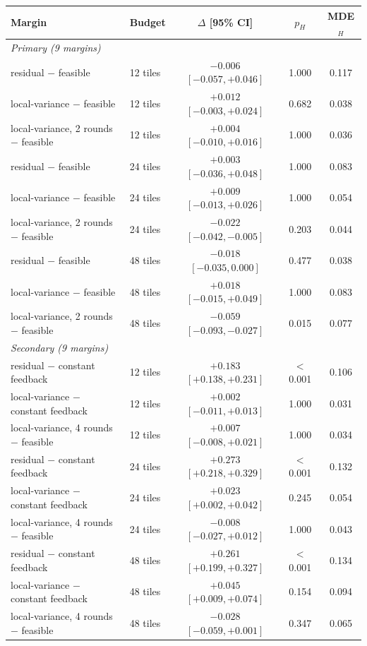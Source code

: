 \begin{tabular}{llccc}
\toprule
Margin & Budget & $\Delta$ [95\% CI] & $p_H$ & MDE$_H$ \\
\midrule
\multicolumn{5}{l}{\emph{Primary (9 margins)}} \\
residual $-$ feasible & 12 tiles & $-0.006$ $[-0.057, {+}0.046]$ & 1.000 & 0.117 \\
local-variance $-$ feasible & 12 tiles & ${+}0.012$ $[-0.003, {+}0.024]$ & 0.682 & 0.038 \\
local-variance, 2 rounds $-$ feasible & 12 tiles & ${+}0.004$ $[-0.010, {+}0.016]$ & 1.000 & 0.036 \\
residual $-$ feasible & 24 tiles & ${+}0.003$ $[-0.036, {+}0.048]$ & 1.000 & 0.083 \\
local-variance $-$ feasible & 24 tiles & ${+}0.009$ $[-0.013, {+}0.026]$ & 1.000 & 0.054 \\
local-variance, 2 rounds $-$ feasible & 24 tiles & $-0.022$ $[-0.042, -0.005]$ & 0.203 & 0.044 \\
residual $-$ feasible & 48 tiles & $-0.018$ $[-0.035, 0.000]$ & 0.477 & 0.038 \\
local-variance $-$ feasible & 48 tiles & ${+}0.018$ $[-0.015, {+}0.049]$ & 1.000 & 0.083 \\
local-variance, 2 rounds $-$ feasible & 48 tiles & $-0.059$ $[-0.093, -0.027]$ & 0.015 & 0.077 \\
\midrule
\multicolumn{5}{l}{\emph{Secondary (9 margins)}} \\
residual $-$ constant feedback & 12 tiles & ${+}0.183$ $[{+}0.138, {+}0.231]$ & $<$0.001 & 0.106 \\
local-variance $-$ constant feedback & 12 tiles & ${+}0.002$ $[-0.011, {+}0.013]$ & 1.000 & 0.031 \\
local-variance, 4 rounds $-$ feasible & 12 tiles & ${+}0.007$ $[-0.008, {+}0.021]$ & 1.000 & 0.034 \\
residual $-$ constant feedback & 24 tiles & ${+}0.273$ $[{+}0.218, {+}0.329]$ & $<$0.001 & 0.132 \\
local-variance $-$ constant feedback & 24 tiles & ${+}0.023$ $[{+}0.002, {+}0.042]$ & 0.245 & 0.054 \\
local-variance, 4 rounds $-$ feasible & 24 tiles & $-0.008$ $[-0.027, {+}0.012]$ & 1.000 & 0.043 \\
residual $-$ constant feedback & 48 tiles & ${+}0.261$ $[{+}0.199, {+}0.327]$ & $<$0.001 & 0.134 \\
local-variance $-$ constant feedback & 48 tiles & ${+}0.045$ $[{+}0.009, {+}0.074]$ & 0.154 & 0.094 \\
local-variance, 4 rounds $-$ feasible & 48 tiles & $-0.028$ $[-0.059, {+}0.001]$ & 0.347 & 0.065 \\
\bottomrule
\end{tabular}